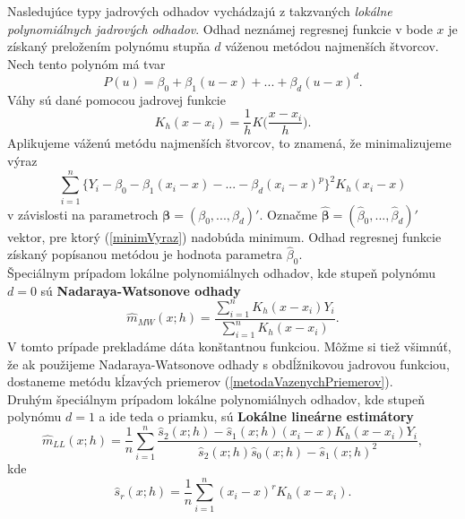 Nasledujúce typy jadrových odhadov vychádzajú z takzvaných \textit{lokálne polynomiálnych jadrových odhadov}. Odhad neznámej regresnej funkcie v bode $x$ je získaný preložením polynómu stupňa $d$ váženou metódou najmenších štvorcov. Nech tento polynóm má tvar
\begin{equation}
P(u)=\beta_0 + \beta_1(u - x) + ... + \beta_d(u - x)^d.
\end{equation}
Váhy sú dané pomocou jadrovej funkcie 
\begin{equation} \label{jadrovaFunkcia}
K_h(x - x_i) = \frac{1}{h}K\Big(\frac{x-x_i}{h}\Big).
\end{equation}
Aplikujeme váženú metódu najmenších štvorcov, to znamená, že minimalizujeme výraz 
\begin{equation}\label{minimVyraz}
 \sum\limits_{i=1}^{n} \{Y_i - \beta_0 - \beta_1(x_i - x) - ... - \beta_d(x_i - x)^p\}^2 K_h(x_i - x)
\end{equation}
v závislosti na parametroch $\pmb{\beta} = (\beta_0,...,\beta_d)'$. Označme $\pmb{\hat{\beta}} = (\hat{\beta}_0,...,\hat{\beta}_d)'$ vektor, pre ktorý (\ref{minimVyraz}) nadobúda minimum. Odhad regresnej funkcie získaný popísanou metódou  je  hodnota parametra $\hat{\beta}_0$.\\
Špeciálnym prípadom lokálne polynomiálnych odhadov, kde stupeň polynómu $d = 0$ sú \textbf{Nadaraya-Watsonove odhady}
\begin{equation}\label{Nadaraya-Watson}
\hat{m}_{MW}(x;h) = \frac{\sum\limits_{i=1}^{n} K_h(x - x_i)Y_i}{\sum\limits_{i=1}^{n} K_h(x - x_i)}.
\end{equation}
V tomto prípade prekladáme dáta konštantnou funkciou. Môžme si tiež všimnúť, že ak použijeme Nadaraya-Watsonove odhady s obdĺžnikovou jadrovou funkciou, dostaneme metódu kĺzavých priemerov (\ref{metodaVazenychPriemerov}).\\
Druhým špeciálnym prípadom lokálne polynomiálnych odhadov, kde stupeň polynómu $d = 1$ a ide teda o priamku, sú 
 \textbf{Lokálne lineárne estimátory}
\begin{equation}
\hat{m}_{LL}(x;h) = \frac{1}{n}\sum\limits_{i=1}^{n}\frac{{\hat{s}_2(x;h) - \hat{s}_1(x;h)(x_i - x)}K_h(x-x_i)Y_i}{\hat{s}_2(x;h)\hat{s}_0(x;h) - \hat{s}_1(x;h)^2},
\end{equation}
kde 
\begin{equation}
\hat{s}_r(x;h) = \frac{1}{n}\sum\limits_{i=1}^{n}(x_i - x)^rK_h(x-x_i).
\end{equation}



